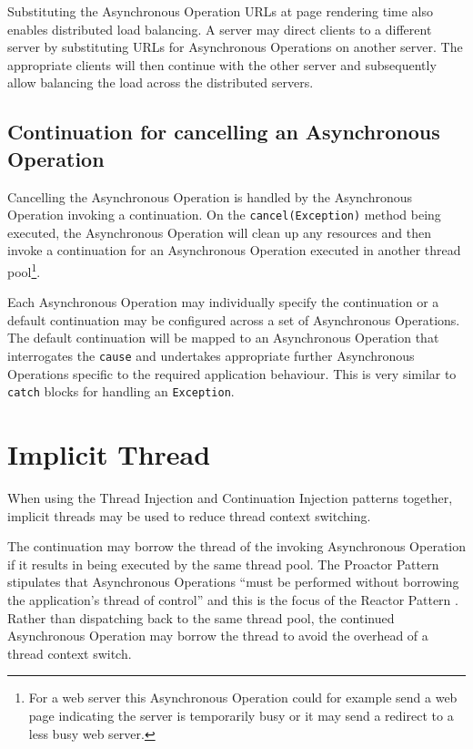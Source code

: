 \documentclass[prodmode]{style/acmlarge}
\begin{document}
Substituting the Asynchronous Operation URLs at page rendering time also enables
distributed load balancing.  A server may direct clients to a different server
by substituting URLs for Asynchronous Operations on another server. The
appropriate clients will then continue with the other server and subsequently
allow balancing the load across the distributed servers.


\subsection{Continuation for cancelling an Asynchronous Operation}

Cancelling the Asynchronous Operation is handled by the Asynchronous Operation
invoking a continuation.  On the \texttt{cancel(Exception)} method being
executed, the Asynchronous Operation will clean up any resources and then invoke
a continuation for an Asynchronous Operation executed in another thread
pool\footnote{For a web server this Asynchronous Operation could for example
send a web page indicating the server is temporarily busy or it may send a
redirect to a less busy web server.}.

Each Asynchronous Operation may individually specify the continuation or a
default continuation may be configured across a set of Asynchronous Operations.
The default continuation will be mapped to an Asynchronous Operation that
interrogates the \texttt{cause} and undertakes appropriate further Asynchronous
Operations specific to the required application behaviour.  This is very similar
to \texttt{catch} blocks for handling an \texttt{Exception}.


\section{Implicit Thread}

When using the Thread Injection and Continuation Injection patterns together,
implicit threads may be used to reduce thread context switching.

The continuation may borrow the thread of the invoking Asynchronous Operation if
it results in being executed by the same thread pool.  The Proactor Pattern
stipulates that Asynchronous Operations ``must be performed without borrowing
the application's thread of control'' \cite[p. 8]{proactor} and this is the
focus of the Reactor Pattern \cite{reactor}.  Rather than dispatching back to
the same thread pool, the continued Asynchronous Operation may borrow the thread
to avoid the overhead of a thread context switch.
\end{document}
